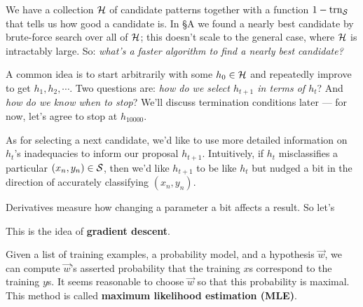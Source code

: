     \newpage


        We have a collection $\mathcal{H}$ of candidate patterns together with a
        function $1-\text{trn}_{\mathcal{S}}$ that tells us how good a candidate is.
        In \S A we found a nearly best candidate by brute-force search over all
        of $\mathcal{H}$; this doesn't scale to the general case, where $\mathcal{H}$ is
        intractably large.
        So: \emph{what's a faster algorithm to find a nearly best candidate?}

        A common idea is to start arbitrarily with some $h_0\in \mathcal{H}$ and
        repeatedly improve to get $h_1, h_2, \cdots$.  Two questions are:
        \emph{how do we select $h_{t+1}$ in terms of $h_t$}?  And \emph{how do
        we know when to stop}?  We'll discuss termination conditions later
        --- for now, let's agree to stop at $h_{10000}$.

        As for selecting a next candidate, we'd like to use more detailed
        information on $h_t$'s inadequacies to inform our proposal $h_{t+1}$.
        Intuitively, if $h_t$ misclassifies a particular $(x_n, y_n) \in \mathcal{S}$,
        then we'd like $h_{t+1}$ to be like $h_t$ but nudged a bit in the
        direction of accurately classifying $(x_n, y_n)$.

        Derivatives measure how changing a parameter a bit affects a result.
        So let's

        This is the idea of \textbf{gradient descent}.

        Given a list of training examples, a probability model, and a
        hypothesis $\vec w$, we can compute $\vec w$'s asserted probability
        that the training $x$s correspond to the training $y$s.  It seems
        reasonable to choose $\vec w$ so that this probability is maximal.
        This method is called \textbf{maximum likelihood estimation (MLE)}.

